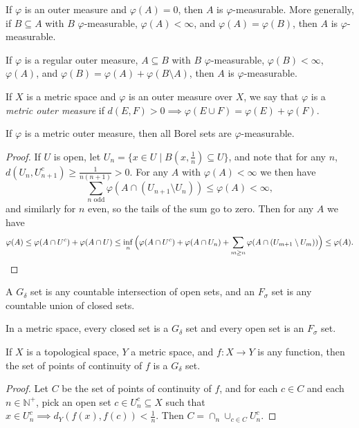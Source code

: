 \begin{prop} If $\varphi$ is an outer measure and $\varphi(A) = 0$, then $A$ is $\varphi$-measurable. More generally, if $B \subseteq A$ with $B$ $\varphi$-measurable, $\varphi(A) < \infty$, and $\varphi(A) = \varphi(B)$, then $A$ is $\varphi$-measurable.
\end{prop}

\begin{prop} If $\varphi$ is a regular outer measure, $A \subseteq B$ with $B$ $\varphi$-measurable, $\varphi(B) < \infty$, $\varphi(A)$, and $\varphi(B) = \varphi(A) + \varphi(B\setminus A)$, then $A$ is $\varphi$-measurable.
\end{prop}

\begin{defn} If $X$ is a metric space and $\varphi$ is an outer measure over $X$, we say that $\varphi$ is a \emph{metric outer measure} if $d(E,F) > 0 \implies \varphi(E \cup F) = \varphi(E) + \varphi(F)$.
\end{defn}

\begin{thm} If $\varphi$ is a metric outer measure, then all Borel sets are $\varphi$-measurable.
\end{thm}
\begin{proof} If $U$ is open, let $U_n = \{x \in U \mid B(x,\frac{1}{n}) \subseteq U\}$, and note that for any $n$, $d(U_n, U_{n+1}^c) \ge \frac{1}{n(n+1)} > 0$. For any $A$ with $\varphi(A) < \infty$ we then have
\[
\sum_{n\text{ odd}} \varphi(A \cap (U_{n+1}\setminus U_n)) \le \varphi(A) < \infty,
\]
and similarly for $n$ even, so the tails of the sum go to zero. Then for any $A$ we have
\[
\varphi(A) \le \varphi(A \cap U^c) + \varphi(A \cap U) \le \inf_n \Big(\varphi(A\cap U^c) + \varphi(A\cap U_n) + \sum_{m \ge n} \varphi(A\cap (U_{m+1}\setminus U_m))\Big) \le \varphi(A).\qedhere
\]
\end{proof}

\begin{defn} A $G_\delta$ set is any countable intersection of open sets, and an $F_\sigma$ set is any countable union of closed sets.
\end{defn}

\begin{prop} In a metric space, every closed set is a $G_\delta$ set and every open set is an $F_\sigma$ set.
\end{prop}

\begin{prop} If $X$ is a topological space, $Y$ a metric space, and $f:X\rightarrow Y$ is any function, then the set of points of continuity of $f$ is a $G_\delta$ set.
\end{prop}
\begin{proof} Let $C$ be the set of points of continuity of $f$, and for each $c \in C$ and each $n \in \mathbb{N}^+$, pick an open set $c \in U_n^c \subseteq X$ such that $x \in U_n^c \implies d_Y(f(x),f(c)) < \frac{1}{n}$. Then $C = \cap_n \cup_{c\in C} U_n^c$.
\end{proof}

